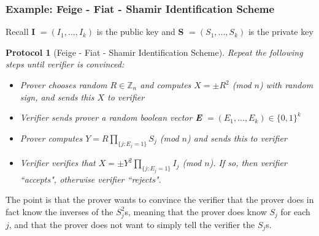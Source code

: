 \documentclass{beamer}
\newtheorem{protocol}{Protocol}
\begin{document}
\begin{frame}
\begin{small}
\frametitle{Example: Feige - Fiat - Shamir Identification Scheme}
Recall \textbf{I} $= (I_1, ..., I_k)$ is the public key and \textbf{S} $= (S_1, ..., S_k)$ is the private key
\vspace{2mm}
\begin{protocol}[Feige - Fiat - Shamir Identification Scheme]
Repeat the following steps until verifier is convinced: 
\begin{itemize}
\item[com] Prover chooses random $R\in\mathbb{Z}_n$ and computes $X = \pm R^2$ (mod $n$) with random sign, and sends this $X$ to verifier
\item[chal] Verifier sends prover a random boolean vector \textbf{E} $= (E_1, ..., E_k)\in\{0,1\}^k$
\item[resp] Prover computes $Y = R\prod_{\{j:E_j = 1\}} S_j$ (mod $n$) and sends this to verifier
\item[verif] Verifier verifies that $X = \pm Y^2\prod_{\{j:E_j = 1\}}I_j$ (mod $n$). If so, then verifier ``accepts", otherwise verifier ``rejects".
\end{itemize}
\end{protocol}
\vspace{2mm}
\pause
The point is that the prover wants to convince the verifier that the prover does in fact know the inverses of the $S_j^2$s, meaning that the prover does know $S_j$ for each $j$, and that the prover does not want to simply tell the verifier the $S_j$s.
\end{small}
\end{frame}

\end{document}
